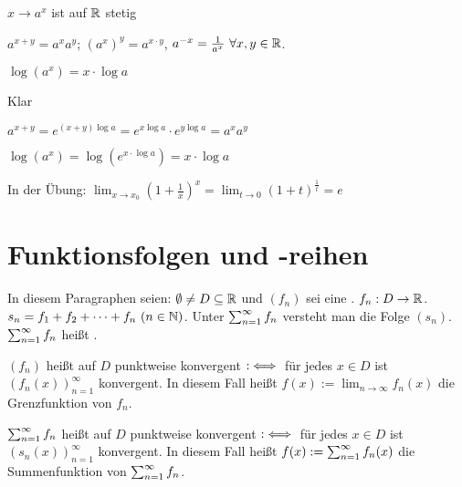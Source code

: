 \documentclass[a4paper,twoside,DIV15,BCOR12mm]{scrbook}
\begin{document}
\begin{eigenschaften}
\begin{liste}
\item $x \to a^x$ ist auf $\mathbb{R}$ stetig
\item $a^{x+y} = a^xa^y$; $(a^x)^y = a^{x\cdot y}$, $a^{-x} = \frac{1}{a^x}\ \forall x,y \in\mathbb{R}$.
\item $\log (a^x) = x\cdot \log a$
\end{liste}

\begin{beweise}
\item Klar
\item $a^{x+y} = e^{(x+y) \log a} = e^{x\log a} \cdot e^{y\log a} = a^xa^y$
\item $\log (a^x) = \log (e^{x\cdot \log a}) = x \cdot \log a$
\end{beweise}

In der Übung: $\displaystyle\lim_{x \to x_0} (1+\frac{1}{x})^x = \lim_{t \to 0} (1+t)^\frac{1}{t} = e$
\end{eigenschaften}

\chapter{Funktionsfolgen und -reihen}

In diesem Paragraphen seien: $\emptyset \ne D \subseteq \mathbb{R}$ und $(f_n)$ sei eine . $f_n:D\to\mathbb{R}$. $s_n = f_1 + f_2 + \cdots + f_n\ (n\in\mathbb{N})$. Unter $\sum_{n=1}^{\infty}{f_n}$ versteht man die Folge $(s_n)$. $\sum_{n=1}^{\infty}{f_n}$ heißt .

\begin{definition}
$(f_n)$ heißt auf $D$ punktweise konvergent $:\iff$ für jedes $x\in D$ ist $(f_n(x))_{n=1}^\infty$ konvergent. In diesem Fall heißt $f(x) := \displaystyle\lim_{n\to\infty} f_n(x)$ die Grenzfunktion von $f_n$.

$\sum_{n=1}^{\infty}{f_n}$ heißt auf $D$ punktweise konvergent $:\iff$ für jedes $x\in D$ ist $(s_n(x))_{n=1}^\infty$ konvergent. In diesem Fall heißt $f(x) := \sum_{n=1}^{\infty}{f_n(x)}$ die Summenfunktion von $\sum_{n=1}^{\infty}{f_n}$.
\end{definition}
\end{document}

